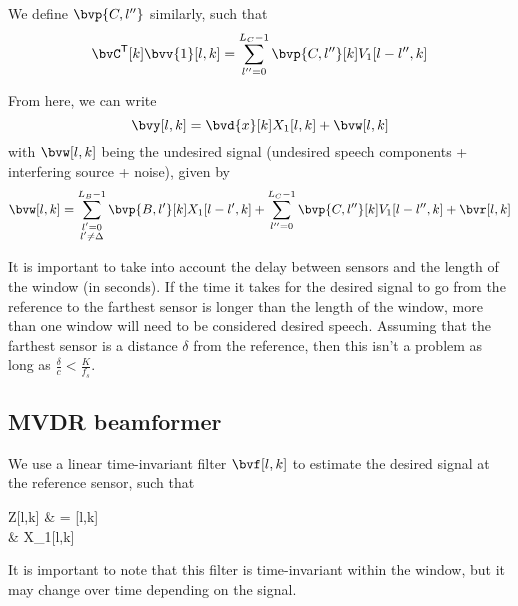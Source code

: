 We define $\bvp{C,l''}$ similarly, such that
\begin{equation}
	\tr{\bvC}[k] \bvv{1}[l,k] = \sum_{l''=0}^{L_C-1} \bvp{C,l''}[k] V_1[l-l'',k]
\end{equation}

From here, we can write
\begin{equation}
	\bvy[l,k] = \bvd{x}[k] X_1[l,k] + \bvw[l,k]
\end{equation}
with $\bvw[l,k]$ being the undesired signal (undesired speech components + interfering source + noise), given by
\begin{equation}
	\bvw[l,k] = \sum_{\substack{l'=0 \\ l' \neq \Delta}}^{L_B-1} \bvp{B,l'}[k] X_1[l-l',k] + \sum_{l''=0}^{L_C-1}\bvp{C,l''}[k] V_1[l-l'',k] + \bvr[l,k]
\end{equation}

It is important to take into account the delay between sensors and the length of the window (in seconds). If the time it takes for the desired signal to go from the reference to the farthest sensor is longer than the length of the window, more than one window will need to be considered desired speech. Assuming that the farthest sensor is a distance $\delta$ from the reference, then this isn't a problem as long as $\frac{\delta}{c} < \frac{K}{f_s}$.

\subsection{MVDR beamformer}

We use a linear time-invariant filter $\bvf[l,k]$ to estimate the desired signal at the reference sensor, such that
\begin{equations}
	Z[l,k]
	& = \he{\bvf}[l,k] \bvy[l,k] \\
	& \approx X_1[l,k]
\end{equations}
It is important to note that this filter is time-invariant within the window, but it may change over time depending on the signal.

